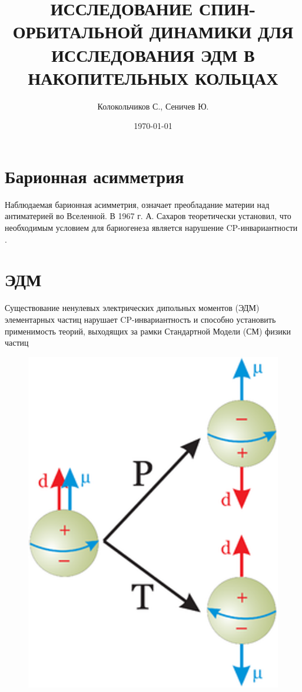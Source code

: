 \documentclass[final]{beamer}
\title
[III-ая Всероссийская школа НЦФМ по физике высоких энергий, ядерной физике и ускорительной технике] %
{ %
ИССЛЕДОВАНИЕ СПИН-ОРБИТАЛЬНОЙ ДИНАМИКИ ДЛЯ ИССЛЕДОВАНИЯ ЭДМ В НАКОПИТЕЛЬНЫХ КОЛЬЦАХ
}
\author{ %
Колокольчиков С., Сеничев Ю.
}
\institute
[Институт Ядерных Исследований РАН, Москва, Россия] %
{
Институт Ядерных Исследований РАН, Москва, Россия\\[0.3ex]
Московский физико-технический институт (НИУ), Долгопрудный, Россия
}
\date{\today}
\begin{document}
\begin{frame}[t]
\begin{multicols}{3}

\section{Барионная асимметрия}
Наблюдаемая барионная асимметрия, означает преобладание материи над антиматерией во Вселенной. В 1967 г. А. Сахаров теоретически установил, что необходимым условием для бариогенеза является нарушение CP-инвариантности \cite{ref1}.
\section{ЭДМ}

Существование ненулевых электрических дипольных моментов (ЭДМ) элементарных частиц нарушает CP-инвариантность и способно установить применимость теорий, выходящих за рамки Стандартной Модели (СМ) физики частиц \cite{ref2}

\begin{figure}[h]
            \centering
            \includegraphics[height=.2\textheight]{EDM CP}
\end{figure}


\end{multicols}
\end{frame}
\end{document}
